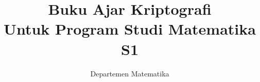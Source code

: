 \usepackage{float}      %
\usepackage{placeins}   %

\renewcommand{\topfraction}{0.9}
\renewcommand{\bottomfraction}{0.8}
\renewcommand{\textfraction}{0.05}
\renewcommand{\floatpagefraction}{0.85}
\setcounter{topnumber}{3}
\setcounter{bottomnumber}{2}
\setcounter{totalnumber}{4}

\makeatletter
\def\fps@figure{!htbp}
\def\fps@table{!htbp}
\makeatother

\let\oldsection\section
\renewcommand{\section}{\FloatBarrier\oldsection}

\let\oldsubsection\subsection
\renewcommand{\subsection}{\FloatBarrier\oldsubsection}

\pretocmd{\lstlisting}{\FloatBarrier}{}{}

\title{\textbf{Buku Ajar Kriptografi}\\
\large Untuk Program Studi Matematika S1}
\author{Departemen Matematika}
\date{}

